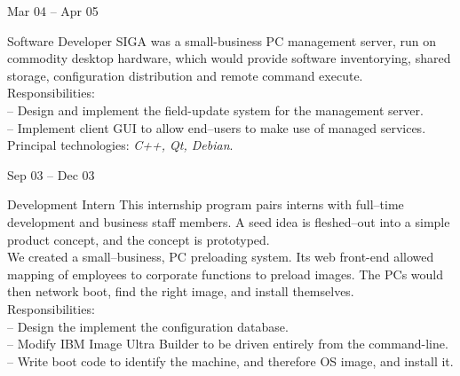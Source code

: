\documentclass[letterpaper, 11pt]{article}
\begin{document}
\begin{resume}
\begin{category}{}
        \end{category}
        \begin{subcategory}{Mar 04 -- Apr 05}
            \begin{block}
                 {Software Developer}
                SIGA was a small-business PC management server, run on commodity desktop
                hardware, which would provide software inventorying, shared storage,
                configuration distribution and remote command execute.
                \\[1ex]
                Responsibilities: \\
                -- Design and implement the field-update system for the management server. \\
                -- Implement client GUI to allow end--users to make use of managed services.
                \\[1ex]
                Principal technologies: \emph{C++, Qt, Debian}.
                \bigskip
            \end{block}
        \end{subcategory}
        \begin{subcategory}{Sep 03 -- Dec 03}
            \begin{block}
                 {Development Intern}
                This internship program pairs interns with full--time development and
                business staff members.  A seed idea is fleshed--out into a simple
                product concept, and the concept is prototyped.
                \\[1ex]
                We created a small--business, PC preloading system.  Its web front-end allowed
                mapping of employees to corporate functions to preload images.  The PCs would
                then network boot, find the right image, and install themselves.
                \\[1ex]
                Responsibilities: \\
                -- Design the implement the configuration database. \\
                -- Modify IBM Image Ultra Builder to be driven entirely from the command-line. \\
                -- Write boot code to identify the machine, and therefore OS image, and install it.
                \bigskip
            \end{block}
        \end{subcategory}

\end{resume}
\end{document}
